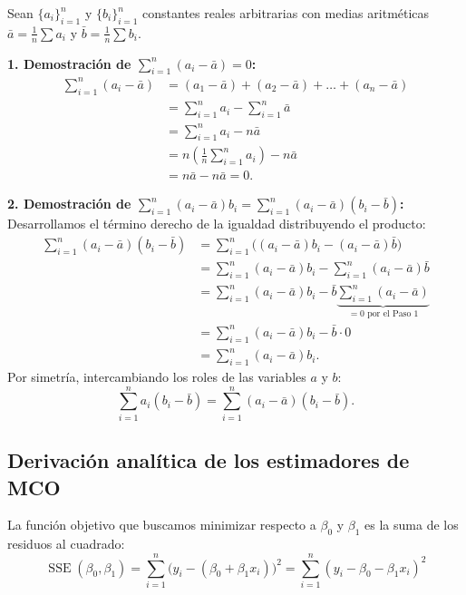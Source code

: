 \documentclass[11pt,a4paper]{article}
\begin{document}
\begin{demobox}
Sean $\{a_i\}_{i=1}^n$ y $\{b_i\}_{i=1}^n$ constantes reales arbitrarias con medias aritméticas $\bar{a} = \frac{1}{n}\sum a_i$ y $\bar{b} = \frac{1}{n}\sum b_i$.

\textbf{1. Demostración de $\sum_{i=1}^n (a_i - \bar{a}) = 0$:}
\begin{align}
\sum_{i=1}^n (a_i - \bar{a}) &= (a_1 - \bar{a}) + (a_2 - \bar{a}) + \dots + (a_n - \bar{a}) \\
&= \sum_{i=1}^n a_i - \sum_{i=1}^n \bar{a} \\
&= \sum_{i=1}^n a_i - n\bar{a} \\
&= n\left(\frac{1}{n}\sum_{i=1}^n a_i\right) - n\bar{a} \\
&= n\bar{a} - n\bar{a} = 0.
\end{align}

\textbf{2. Demostración de $\sum_{i=1}^n (a_i - \bar{a})b_i = \sum_{i=1}^n (a_i - \bar{a})(b_i - \bar{b})$:}  
Desarrollamos el término derecho de la igualdad distribuyendo el producto:
\begin{align}
\sum_{i=1}^n (a_i - \bar{a})(b_i - \bar{b}) &= \sum_{i=1}^n \Big( (a_i - \bar{a})b_i - (a_i - \bar{a})\bar{b} \Big) \\
&= \sum_{i=1}^n (a_i - \bar{a})b_i - \sum_{i=1}^n (a_i - \bar{a})\bar{b} \\
&= \sum_{i=1}^n (a_i - \bar{a})b_i - \bar{b} \underbrace{\sum_{i=1}^n (a_i - \bar{a})}_{= 0 \text{ por el Paso 1}} \\
&= \sum_{i=1}^n (a_i - \bar{a})b_i - \bar{b} \cdot 0 \\
&= \sum_{i=1}^n (a_i - \bar{a})b_i.
\end{align}
Por simetría, intercambiando los roles de las variables $a$ y $b$:
\begin{equation}
\sum_{i=1}^n a_i (b_i - \bar{b}) = \sum_{i=1}^n (a_i - \bar{a})(b_i - \bar{b}).
\end{equation}
\end{demobox}



\subsection{Derivación analítica de los estimadores de MCO}

La función objetivo que buscamos minimizar respecto a $\beta_0$ y $\beta_1$ es la suma de los residuos al cuadrado:
\begin{equation}
\operatorname{SSE}(\beta_0, \beta_1) = \sum_{i=1}^n \big( y_i - (\beta_0 + \beta_1 x_i) \big)^2 = \sum_{i=1}^n (y_i - \beta_0 - \beta_1 x_i)^2
\end{equation}
\end{document}
